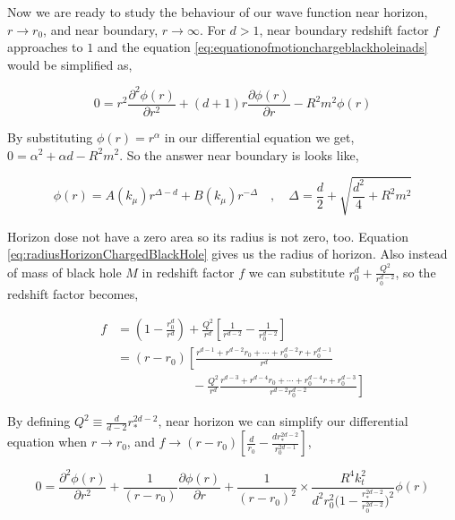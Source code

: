 Now we are ready to study the behaviour of our wave function near horizon, $r \rightarrow r_0$, and near boundary, $r \rightarrow \infty$. For $d > 1$, near boundary redshift factor $f$ approaches to $1$ and the equation \ref{eq:equationofmotionchargeblackholeinads} would be simplified as,

\begin{equation} \label{eq:appsolutoinnearboundary}
    0 = r^2\frac{\partial^2\phi(r)}{\partial r^2} + (d+1)r\frac{\partial \phi(r)}{\partial r} - R^2m^2\phi(r)
\end{equation}

By substituting $\phi(r) = r^\alpha$ in our differential equation we get, $0 = \alpha^2 + \alpha d -R^2m^2$. So the answer near boundary is looks like,

\begin{equation} \label{eq:appsolutoinnearhorizon}
    \phi(r) = A(k_\mu)r^{\Delta-d} + B(k_\mu)r^{-\Delta} \quad , \quad \Delta = \frac{d}{2} + \sqrt{\frac{d^2}{4} + R^2m^2}
\end{equation}

Horizon dose not have a zero area so its radius is not zero, too. Equation \ref{eq:radiusHorizonChargedBlackHole} gives us the radius of horizon. Also instead of mass of black hole $M$ in redshift factor $f$ we can substitute $r^d_0 + \frac{Q^2}{r^{d-2}_0}$, so the redshift factor becomes,

\begin{align} \label{eq:redshiftfactorr0r*}
    f &= (1 - \frac{r^d_0}{r^d}) + \frac{Q^2}{r^d}\left[\frac{1}{r^{d-2}} - \frac{1}{r^{d-2}_0} \right] \\
      &= (r-r_0) \left[ \frac{r^{d-1} + r^{d-2}r_0 + \cdots + r^{d-2}_0r + r^{d-1}_0 }{r^d} \right. \nonumber\\
      & \qquad \qquad \qquad - \left. \frac{Q^2}{r^d}\frac{r^{d-3} + r^{d-4}r_0 + \cdots + r^{d-4}_0r + r^{d-3}_0}{r^{d-2}r^{d-2}_0} \right]
\end{align}

By defining $Q^2 \equiv \frac{d}{d-2}r^{2d-2}_*$, near horizon we can simplify our differential equation when $r \rightarrow r_0$, and $f \rightarrow (r-r_0)\left[\frac{d}{r_0} - \frac{dr^{2d-2}_*}{r^{2d-1}_0} \right]$,

\begin{equation}
    0 = \frac{\partial^2 \phi(r)}{\partial r^2} + \frac{1}{(r-r_0)}\frac{\partial \phi(r)}{\partial r} + \frac{1}{(r-r_0)^2} \times \frac{R^4k^2_t}{d^2r_0^2 \big(1-\frac{r^{2d-2}_*}{r^{2d-2}_0}\big)^2}\phi(r)
\end{equation}

